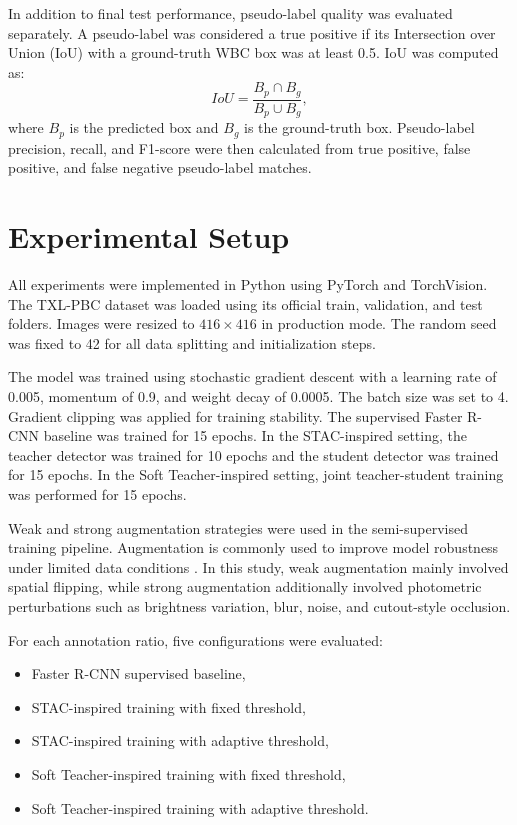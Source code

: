 \documentclass[conference,a4paper]{IEEEtran}
\begin{document}
In addition to final test performance, pseudo-label quality was evaluated separately. A pseudo-label was considered a true positive if its Intersection over Union (IoU) with a ground-truth WBC box was at least 0.5. IoU was computed as:
\begin{equation}
IoU = \frac{B_p \cap B_g}{B_p \cup B_g},
\end{equation}
where $B_p$ is the predicted box and $B_g$ is the ground-truth box. Pseudo-label precision, recall, and F1-score were then calculated from true positive, false positive, and false negative pseudo-label matches.

\section{Experimental Setup}
All experiments were implemented in Python using PyTorch and TorchVision. The TXL-PBC dataset was loaded using its official train, validation, and test folders. Images were resized to $416 \times 416$ in production mode. The random seed was fixed to 42 for all data splitting and initialization steps.

The model was trained using stochastic gradient descent with a learning rate of 0.005, momentum of 0.9, and weight decay of 0.0005. The batch size was set to 4. Gradient clipping was applied for training stability. The supervised Faster R-CNN baseline was trained for 15 epochs. In the STAC-inspired setting, the teacher detector was trained for 10 epochs and the student detector was trained for 15 epochs. In the Soft Teacher-inspired setting, joint teacher-student training was performed for 15 epochs.

Weak and strong augmentation strategies were used in the semi-supervised training pipeline. Augmentation is commonly used to improve model robustness under limited data conditions \cite{shorten2019augmentation}. In this study, weak augmentation mainly involved spatial flipping, while strong augmentation additionally involved photometric perturbations such as brightness variation, blur, noise, and cutout-style occlusion.

For each annotation ratio, five configurations were evaluated:
\begin{itemize}
    \item Faster R-CNN supervised baseline,
    \item STAC-inspired training with fixed threshold,
    \item STAC-inspired training with adaptive threshold,
    \item Soft Teacher-inspired training with fixed threshold,
    \item Soft Teacher-inspired training with adaptive threshold.
\end{itemize}
\end{document}
